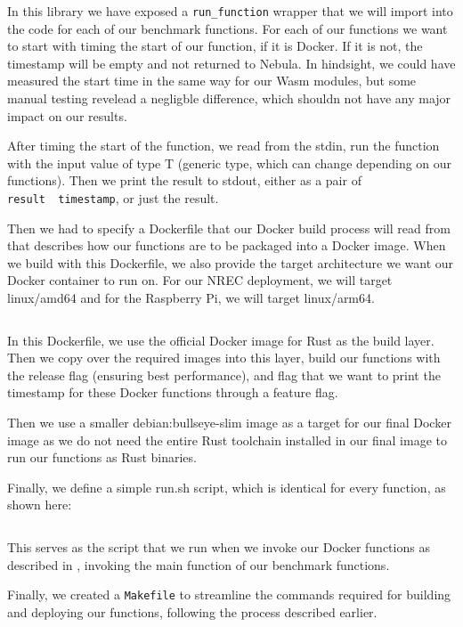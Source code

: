 \documentclass[
  table]{report}
\begin{document}
\inputminted{rust}{assets/code/shared_lib.rs}

In this library we have exposed a \texttt{run\_function} wrapper that we
will import into the code for each of our benchmark functions. For each
of our functions we want to start with timing the start of our function,
if it is Docker. If it is not, the timestamp will be empty and not
returned to Nebula. In hindsight, we could have measured the start time
in the same way for our \ac{Wasm} modules, but some manual testing
revelead a negligble difference, which shouldn not have any major impact
on our results.

After timing the start of the function, we read from the stdin, run the
function with the input value of type T (generic type, which can change
depending on our functions). Then we print the result to stdout, either
as a pair of \texttt{result\ \textbar{}\ timestamp}, or just the result.

Then we had to specify a Dockerfile that our Docker build process will
read from that describes how our functions are to be packaged into a
Docker image. When we build with this Dockerfile, we also provide the
target architecture we want our Docker container to run on. For our
\ac{NREC} deployment, we will target linux/amd64 and for the Raspberry
Pi, we will target linux/arm64.

\inputminted{toml}{assets/code/Dockerfile}

In this Dockerfile, we use the official Docker image for Rust as the
build layer. Then we copy over the required images into this layer,
build our functions with the release flag (ensuring best performance),
and flag that we want to print the timestamp for these Docker functions
through a feature flag.

Then we use a smaller debian:bullseye-slim image as a target for our
final Docker image as we do not need the entire Rust toolchain installed
in our final image to run our functions as Rust binaries.

Finally, we define a simple run.sh script, which is identical for every
function, as shown here:

\inputminted[firstline=2, lastline=4]{bash}{assets/code/commands.sh}

This serves as the script that we run when we invoke our Docker
functions as described in , invoking the main
function of our benchmark functions.

Finally, we created a \texttt{Makefile} to streamline the commands
required for building and deploying our functions, following the process
described earlier.
\end{document}
